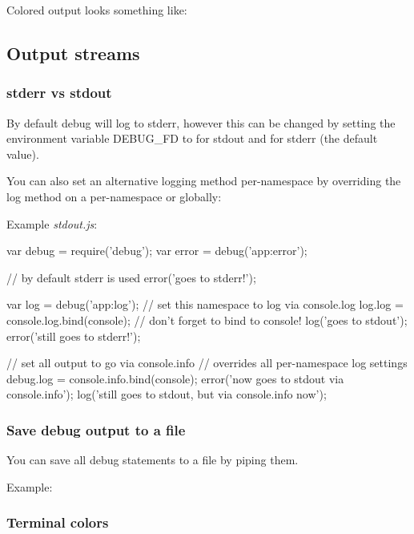 Colored output looks something like\+:



\subsection*{Output streams}

\subsubsection*{stderr vs stdout}

By default {\ttfamily debug} will log to stderr, however this can be changed by setting the environment variable {\ttfamily D\+E\+B\+U\+G\+\_\+\+FD} to {} for stdout and {} for stderr (the default value).

You can also set an alternative logging method per-\/namespace by overriding the {\ttfamily log} method on a per-\/namespace or globally\+:

Example {\itshape stdout.\+js}\+:


\begin{DoxyCode}
var debug = require('debug');
var error = debug('app:error');

// by default stderr is used
error('goes to stderr!');

var log = debug('app:log');
// set this namespace to log via console.log
log.log = console.log.bind(console); // don't forget to bind to console!
log('goes to stdout');
error('still goes to stderr!');

// set all output to go via console.info
// overrides all per-namespace log settings
debug.log = console.info.bind(console);
error('now goes to stdout via console.info');
log('still goes to stdout, but via console.info now');
\end{DoxyCode}


\subsubsection*{Save debug output to a file}

You can save all debug statements to a file by piping them.

Example\+:




\subsubsection*{Terminal colors}

